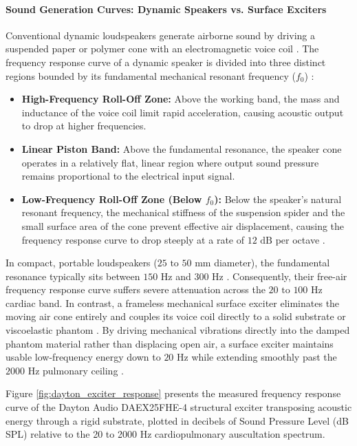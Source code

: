 \paragraph{Sound Generation Curves: Dynamic Speakers vs. Surface Exciters}
Conventional dynamic loudspeakers generate airborne sound by driving a suspended paper or polymer cone with an electromagnetic voice coil \cite{ballou2015handbook}. The frequency response curve of a dynamic speaker is divided into three distinct regions bounded by its fundamental mechanical resonant frequency ($f_0$) \cite{ballou2015handbook}:
\begin{itemize}
    \item \textbf{High-Frequency Roll-Off Zone:} Above the working band, the mass and inductance of the voice coil limit rapid acceleration, causing acoustic output to drop at higher frequencies.
    \item \textbf{Linear Piston Band:} Above the fundamental resonance, the speaker cone operates in a relatively flat, linear region where output sound pressure remains proportional to the electrical input signal.
    \item \textbf{Low-Frequency Roll-Off Zone (Below $f_0$):} Below the speaker's natural resonant frequency, the mechanical stiffness of the suspension spider and the small surface area of the cone prevent effective air displacement, causing the frequency response curve to drop steeply at a rate of $12\text{ dB}$ per octave \cite{ballou2015handbook}.
\end{itemize}
In compact, portable loudspeakers ($25\text{ to }50\text{ mm}$ diameter), the fundamental resonance typically sits between $150\text{ Hz}$ and $300\text{ Hz}$ \cite{ballou2015handbook}. Consequently, their free-air frequency response curve suffers severe attenuation across the $20\text{ to }100\text{ Hz}$ cardiac band. In contrast, a frameless mechanical surface exciter eliminates the moving air cone entirely and couples its voice coil directly to a solid substrate or viscoelastic phantom \cite{klum2019validation}. By driving mechanical vibrations directly into the damped phantom material rather than displacing open air, a surface exciter maintains usable low-frequency energy down to $20\text{ Hz}$ while extending smoothly past the $2000\text{ Hz}$ pulmonary ceiling \cite{klum2019validation}.

Figure \ref{fig:dayton_exciter_response} presents the measured frequency response curve of the Dayton Audio DAEX25FHE-4 structural exciter transposing acoustic energy through a rigid substrate, plotted in decibels of Sound Pressure Level (dB SPL) relative to the 20 to 2000 Hz cardiopulmonary auscultation spectrum.


